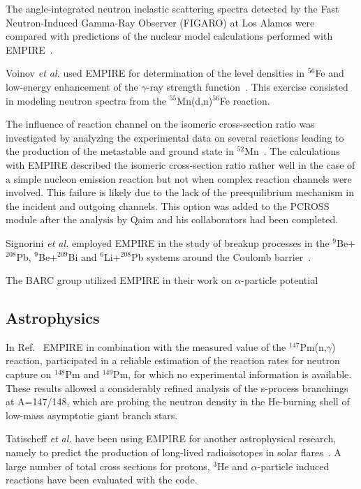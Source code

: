 \documentclass[twocolumn,amsmath,amssymb,10pt,groupedaddress,a4paper]{revtex4}
\begin{document}
The angle-integrated neutron inelastic scattering spectra detected by the Fast Neutron-Induced Gamma-Ray Observer (FIGARO) at Los Alamos were compared with predictions of the nuclear model calculations performed with EMPIRE~\cite{rochman2004nir}.

Voinov \textit{et al.} used EMPIRE for determination of the level densities in $^{56}$Fe
and low-energy enhancement of the $\gamma$-ray strength function~\cite{Voinov:06}.
This exercise consisted in modeling neutron spectra from the $^{55}$Mn(d,n)$^{56}$Fe reaction.

The influence of reaction channel on the isomeric cross-section ratio was investigated by analyzing the experimental data on several reactions leading to the production of the metastable and ground state in $^{52}$Mn~\cite{Qaim:05}. The calculations with EMPIRE described the isomeric cross-section ratio rather well in the case of a simple nucleon emission reaction but not when complex reaction channels were involved. This failure is likely due to the lack of the preequilibrium mechanism in the incident and outgoing channels. This option was added to the PCROSS module after the analysis by Qaim and his collaborators had been completed.

Signorini \textit{et al.} employed EMPIRE in the study of breakup processes in the $^9$Be+$^{208}$Pb, $^9$Be+$^{209}$Bi and $^6$Li+$^{208}$Pb systems around the Coulomb barrier~\cite{signorini2004bps}.

The BARC group utilized EMPIRE in their work on $\alpha$-particle potential~\cite{Kumar:06}

\subsection{Astrophysics}
In Ref.~\cite{reifarth2003snc} EMPIRE in combination
with the measured value of the $^{147}$Pm(n,$\gamma$) reaction, participated in a reliable estimation of the reaction rates for neutron capture on $^{148}$Pm and $^{149}$Pm, for which no experimental information is available. These results allowed a considerably refined analysis of the s-process branchings at A=147/148, which are probing the neutron density in the He-burning shell of low-mass asymptotic giant branch stars.

Tatischeff \textit{et al.} have been using EMPIRE for another astrophysical research, namely to predict the production of long-lived radioisotopes in solar flares~\cite{Tatischeff:06}. A large number of total cross sections for protons, $^3$He and $\alpha$-particle induced reactions have been evaluated with the code.
\end{document}
